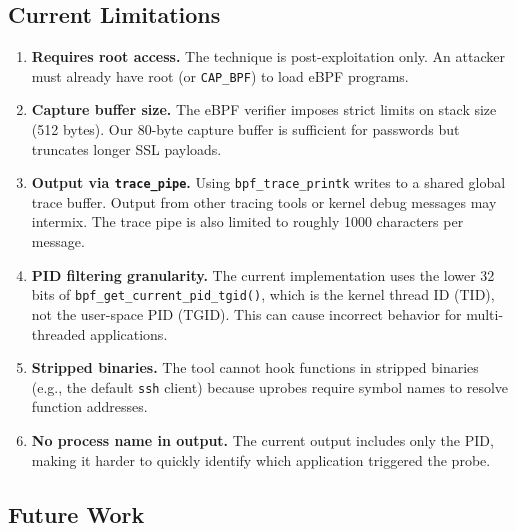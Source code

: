 \documentclass[11pt,a4paper]{article}
\begin{document}
\subsection{Current Limitations}
\label{subsec:limitations}

\begin{enumerate}
    \item \textbf{Requires root access.} The technique is post-exploitation
          only. An attacker must already have root (or \texttt{CAP\_BPF}) to
          load eBPF programs.

    \item \textbf{Capture buffer size.} The eBPF verifier imposes strict limits
          on stack size (512 bytes). Our 80-byte capture buffer is sufficient
          for passwords but truncates longer SSL payloads.

    \item \textbf{Output via \texttt{trace\_pipe}.} Using
          \texttt{bpf\_trace\_printk} writes to a shared global trace buffer.
          Output from other tracing tools or kernel debug messages may
          intermix. The trace pipe is also limited to roughly 1000 characters
          per message.

    \item \textbf{PID filtering granularity.} The current implementation uses
          the lower 32 bits of \texttt{bpf\_get\_current\_\allowbreak{}pid\_tgid()},
          which is the kernel thread ID (TID), not the user-space PID (TGID).
          This can cause incorrect behavior for multi-threaded applications.

    \item \textbf{Stripped binaries.} The tool cannot hook functions in
          stripped binaries (e.g., the default \texttt{ssh} client) because
          uprobes require symbol names to resolve function addresses.

    \item \textbf{No process name in output.} The current output includes only
          the PID, making it harder to quickly identify which application
          triggered the probe.
\end{enumerate}

\subsection{Future Work}
\label{subsec:future}
\end{document}
